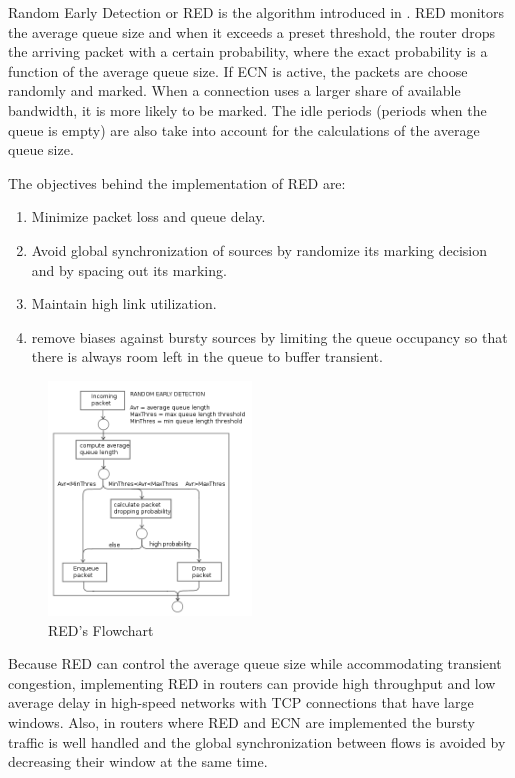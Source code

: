 Random Early Detection or RED is the algorithm introduced in
\cite{FloydJacobsonRED}. RED monitors the average queue size and when it
exceeds a preset threshold, the router drops the arriving packet with a
certain probability, where the exact probability is a function of the average
queue size. If \gls{ECN} is active, the packets are choose randomly and marked. When
a connection uses a larger share of available bandwidth, it is more likely to
be marked. The idle periods (periods when the queue is empty) are also take
into account for the calculations of the average queue size.

The objectives behind the  implementation of RED are:
\begin{enumerate}
\item Minimize packet loss and queue delay.
\item Avoid global synchronization of sources by randomize its marking
decision and by spacing out its marking.
\item Maintain high link utilization.
\item remove biases against bursty sources by limiting the queue occupancy so
that there is always room left in the queue to buffer transient.
\end{enumerate}

\begin{figure}
  \begin{center}
    \includegraphics[width=0.48\textwidth]{img/RED}
  \end{center}
  \caption{RED's Flowchart}
  \label{fig:RED}
\end{figure}

Because RED can control the average queue size while accommodating transient
congestion, implementing RED in routers can provide high throughput and low
average delay in high-speed networks with TCP connections that have large
windows. Also, in routers where RED and ECN are implemented the bursty traffic
is well handled and the global synchronization between flows is avoided by
decreasing their window at the same time.

